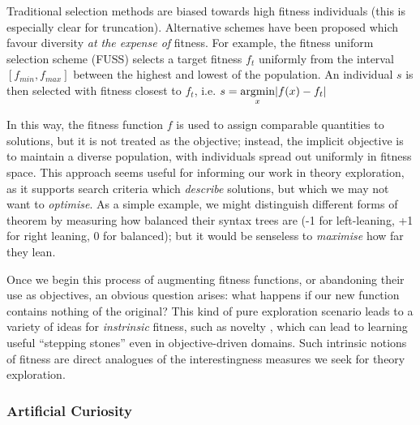 \newcommand{\argmin}{\operatornamewithlimits{argmin}}

Traditional selection methods are biased towards high fitness individuals (this is especially clear for truncation). Alternative schemes have been proposed which favour diversity \emph{at the expense of} fitness. For example, the fitness uniform selection scheme (FUSS) \citep{hutter2002fitness} selects a target fitness $f_t$ uniformly from the interval $\left[ f_{min}, f_{max} \right]$ between the highest and lowest of the population. An individual $s$ is then selected with fitness closest to $f_t$, i.e. $s = \operatornamewithlimits{argmin}\limits_{x} \lvert f(x) - f_t \rvert$

In this way, the fitness function $f$ is used to assign comparable quantities to solutions, but it is not treated as the objective; instead, the implicit objective is to maintain a diverse population, with individuals spread out uniformly in fitness space. This approach seems useful for informing our work in theory exploration, as it supports search criteria which \emph{describe} solutions, but which we may not want to \emph{optimise}. As a simple example, we might distinguish different forms of theorem by measuring how balanced their syntax trees are (-1 for left-leaning, +1 for right leaning, 0 for balanced); but it would be senseless to \emph{maximise} how far they lean.

Once we begin this process of augmenting fitness functions, or abandoning their use as objectives, an obvious question arises: what happens if our new function contains nothing of the original? This kind of pure exploration scenario leads to a variety of ideas for \emph{instrinsic} fitness, such as novelty \citep{lehman2011abandoning}, which can lead to learning useful ``stepping stones'' even in objective-driven domains. Such intrinsic notions of fitness are direct analogues of the interestingness measures we seek for theory exploration.

\subsubsection{Artificial Curiosity}
\label{curiosity}

